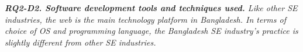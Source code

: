 \begin{tcolorbox}[flushleft upper,boxrule=1pt,arc=0pt,left=0pt,right=0pt,top=0pt,bottom=0pt,colback=white,after=\ignorespacesafterend\par\noindent]
\nd\it{\bf{RQ2-D2. Software development tools and techniques used.}}
Like other SE industries, the web is the main technology platform in Bangladesh. In terms of choice of OS and programming language, the Bangladesh SE industry's practice is slightly different from other SE industries.
\end{tcolorbox}